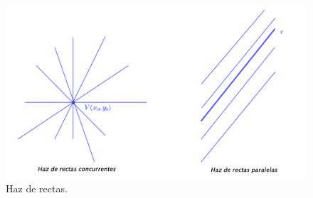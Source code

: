 \vspace{0.5cm}
\begin{figure}[H]
	\centering
	\includegraphics[width=.75\textwidth]{img-ga/ga17.png}
	\caption*{\footnotesize{\textcolor{gris}{Haz de rectas.}}}
\end{figure}
\vspace{5mm}
